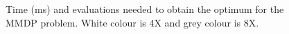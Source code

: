 \documentclass[final,1p,times]{elsarticle}
\begin{document}
\begin{figure}[htb]
\caption{Time (ms) and evaluations needed to obtain the optimum for the MMDP problem. White colour is 4X and grey colour is 8X.}
\label{fig:boxplotsMMDP}
\end{figure}











\end{document}
